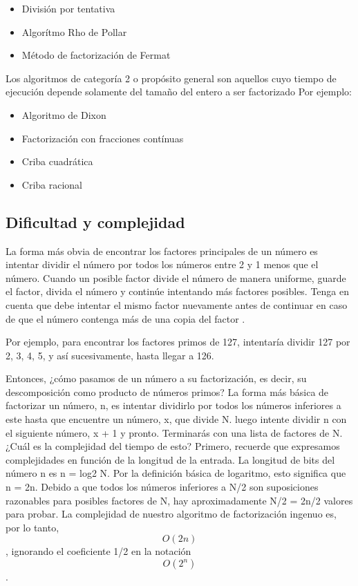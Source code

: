\documentclass{article}
\begin{document}
\begin{itemize}
\item División por tentativa
\item Algorítmo Rho de Pollar
\item Método de factorización de Fermat
\end{itemize}

Los algoritmos de categoría 2 o propósito general son aquellos cuyo tiempo de
ejecución depende solamente del tamaño del entero a ser factorizado Por ejemplo:

\begin{itemize}
\item Algoritmo de Dixon
\item Factorización con fracciones contínuas
\item Criba cuadrática
\item Criba racional
\end{itemize}

\subsection{Dificultad y complejidad}

La forma más obvia de encontrar los factores principales de un número es
intentar dividir el número por todos los números entre 2 y 1 menos que el
número. Cuando un posible factor divide el número de manera uniforme, guarde el
factor, divida el número y continúe intentando más factores posibles. Tenga en
cuenta que debe intentar el mismo factor nuevamente antes de continuar en caso
de que el número contenga más de una copia del factor
\cite{stephens2019essential}.

Por ejemplo, para encontrar los factores primos de 127, intentaría dividir 127
por 2, 3, 4, 5, y así sucesivamente, hasta llegar a 126.

Entonces, ¿cómo pasamos de un número a su factorización, es decir, su
descomposición como producto de números primos? La forma más básica de
factorizar un número, n, es intentar dividirlo por todos los números inferiores
a este hasta que encuentre un número, x, que divide N. luego intente dividir n
con el siguiente número, x + 1 y pronto. Terminarás con una lista de factores de
N. ¿Cuál es la complejidad del tiempo de esto? Primero, recuerde que expresamos
complejidades en función de la longitud de la entrada. La longitud de bits del
número n es n = log2 N. Por la definición básica de logaritmo, esto significa
que n = 2n. Debido a que todos los números inferiores a N/2 son suposiciones
razonables para posibles factores de N, hay aproximadamente N/2 = 2n/2 valores
para probar. La complejidad de nuestro algoritmo de factorización ingenuo es,
por lo tanto, $$ O(2n)$$, ignorando el coeficiente 1/2 en la notación $$ O(2^n)$$.
\end{document}
